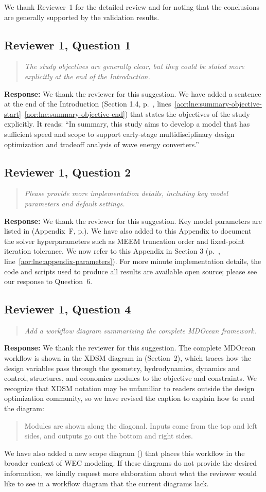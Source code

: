 \documentclass[11pt]{article}
\newcommand{\rcomment}[2]{\subsection*{#1}\begin{quote}\itshape #2\end{quote}}
\newcommand{\response}{\noindent\textbf{Response:} }
\begin{document}
We thank Reviewer~1 for the detailed review and for noting that the conclusions are generally supported by the validation results.

\rcomment{Reviewer 1, Question 1}{The study objectives are generally clear, but they could be stated more explicitly at the end of the Introduction.}
\response We thank the reviewer for this suggestion.
We have added a sentence at the end of the Introduction 
(Section 1.4, p.~\pageref{aor:lne:summary-objective-start}, lines~\ref{aor:lne:summary-objective-start}--\ref{aor:lne:summary-objective-end})
that states the objectives of the study explicitly.
It reads: ``In summary, this study aims to develop a model that has sufficient speed and scope to support early-stage multidisciplinary design optimization and tradeoff analysis of wave energy converters.''

\rcomment{Reviewer 1, Question 2}{Please provide more implementation details, including key model parameters and default settings.}
\response We thank the reviewer for this suggestion. Key model parameters are listed in  (Appendix~F, p.\pageref{aor:tab:parameters}).
We have also added  to this Appendix to document the solver hyperparameters such as MEEM truncation order and fixed-point iteration tolerance.
We now refer to this Appendix in Section 3 (p.~\pageref{aor:lne:appendix-parameters}, line~\ref{aor:lne:appendix-parameters}).
For more minute implementation details, the code and scripts used to produce all results are available open source; please see our response to Question~6.

\rcomment{Reviewer 1, Question 4}{Add a workflow diagram summarizing the complete MDOcean framework.}
\response We thank the reviewer for this suggestion.
The complete MDOcean workflow is shown in the XDSM diagram in  (Section~2), which traces how the design variables pass through the geometry, hydrodynamics, dynamics and control, structures, and economics modules to the objective and constraints.
We recognize that XDSM notation may be unfamiliar to readers outside the design optimization community, so we have revised the caption to explain how to read the diagram:
\begin{quote}
Modules are shown along the diagonal. Inputs come from the top and left sides, and outputs
go out the bottom and right sides.
\end{quote}
We have also added a new scope diagram () that places this workflow in the broader context of WEC modeling.
If these diagrams do not provide the desired information, we kindly request more elaboration about what the reviewer would like to see in a workflow diagram that the current diagrams lack.
\end{document}

